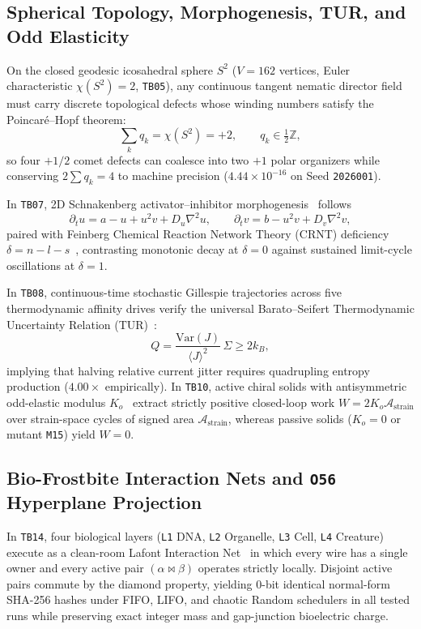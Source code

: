 \documentclass[11pt,reqno]{amsart}
\begin{document}
\subsection{Spherical Topology, Morphogenesis, TUR, and Odd Elasticity}
On the closed geodesic icosahedral sphere $S^2$ ($V=162$ vertices, Euler characteristic $\chi(S^2) = 2$, \texttt{TB05}), any continuous tangent nematic director field must carry discrete topological defects whose winding numbers satisfy the Poincar\'e--Hopf theorem:
\begin{equation}
  \sum_{k} q_k = \chi(S^2) = +2, \qquad q_k \in \tfrac{1}{2}\mathbb{Z},
  \label{eq:poincare}
\end{equation}
so four $+1/2$ comet defects can coalesce into two $+1$ polar organizers while conserving $2\sum q_k = 4$ to machine precision ($4.44\times 10^{-16}$ on Seed \texttt{2026001}).

In \texttt{TB07}, 2D Schnakenberg activator--inhibitor morphogenesis~\cite{turing1952chemical} follows
\begin{equation}
  \partial_t u = a - u + u^2 v + D_u \nabla^2 u, \qquad \partial_t v = b - u^2 v + D_v \nabla^2 v,
  \label{eq:turing}
\end{equation}
paired with Feinberg Chemical Reaction Network Theory (CRNT) deficiency $\delta = n - l - s$~\cite{feinberg1987chemical}, contrasting monotonic decay at $\delta = 0$ against sustained limit-cycle oscillations at $\delta = 1$.

In \texttt{TB08}, continuous-time stochastic Gillespie trajectories across five thermodynamic affinity drives verify the universal Barato--Seifert Thermodynamic Uncertainty Relation (TUR)~\cite{barato2015thermodynamic}:
\begin{equation}
  Q = \frac{\mathrm{Var}(J)}{\langle J \rangle^2}\,\Sigma \ge 2 k_B,
  \label{eq:tur}
\end{equation}
implying that halving relative current jitter requires quadrupling entropy production ($4.00\times$ empirically). In \texttt{TB10}, active chiral solids with antisymmetric odd-elastic modulus $K_o$~\cite{scheibner2020odd} extract strictly positive closed-loop work $W = 2 K_o \mathcal{A}_{\mathrm{strain}}$ over strain-space cycles of signed area $\mathcal{A}_{\mathrm{strain}}$, whereas passive solids ($K_o = 0$ or mutant \texttt{M15}) yield $W = 0$.

\subsection{Bio-Frostbite Interaction Nets and \texorpdfstring{\texttt{O56}}{O56} Hyperplane Projection}
In \texttt{TB14}, four biological layers (\texttt{L1} DNA, \texttt{L2} Organelle, \texttt{L3} Cell, \texttt{L4} Creature) execute as a clean-room Lafont Interaction Net~\cite{lafont1990interaction} in which every wire has a single owner and every active pair $(\alpha \bowtie \beta)$ operates strictly locally. Disjoint active pairs commute by the diamond property, yielding 0-bit identical normal-form SHA-256 hashes under FIFO, LIFO, and chaotic Random schedulers in all tested runs while preserving exact integer mass and gap-junction bioelectric charge.
\end{document}
